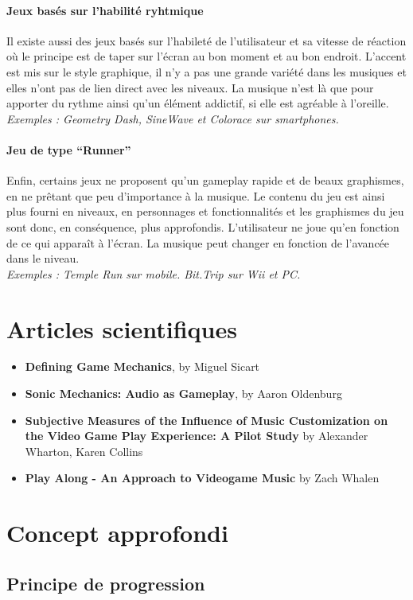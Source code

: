\documentclass[a4paper,11pt]{article}
\begin{document}
\paragraph{Jeux basés sur l’habilité ryhtmique}
Il existe aussi des jeux basés sur l’habileté de l’utilisateur et sa vitesse de réaction où le principe est de taper sur l’écran au bon moment et au bon endroit. L'accent est mis sur le style graphique, il n'y a pas une grande variété dans les musiques et elles n'ont pas de lien direct avec les niveaux. La musique n'est là que pour apporter du rythme ainsi qu’un élément addictif, si elle est agréable à l’oreille.\\
\textit{Exemples : Geometry Dash, SineWave et Colorace sur smartphones.}
\paragraph{Jeu de type “Runner”}
Enfin, certains jeux ne proposent qu’un gameplay rapide et de beaux graphismes, en ne prêtant que peu d’importance à la musique. Le contenu du jeu est ainsi plus fourni en niveaux, en personnages et fonctionnalités et les graphismes du jeu sont donc, en conséquence, plus approfondis. L’utilisateur ne joue qu’en fonction de ce qui apparaît à l’écran. La musique peut changer en fonction de l’avancée dans le niveau.\\
\textit{Exemples : Temple Run sur mobile. Bit.Trip sur Wii et PC.}

\section{Articles scientifiques}
\begin{itemize}
\item \textbf{Defining Game Mechanics}, by Miguel Sicart
\item \textbf{Sonic Mechanics: Audio as Gameplay}, by Aaron Oldenburg 
\item \textbf{Subjective Measures of the Influence of Music Customization on the Video Game Play Experience: A Pilot Study} by Alexander Wharton, Karen Collins
\item \textbf{Play Along - An Approach to Videogame Music} by Zach Whalen
\end{itemize}


\section{Concept approfondi}
\subsection{Principe de progression}
\end{document}
